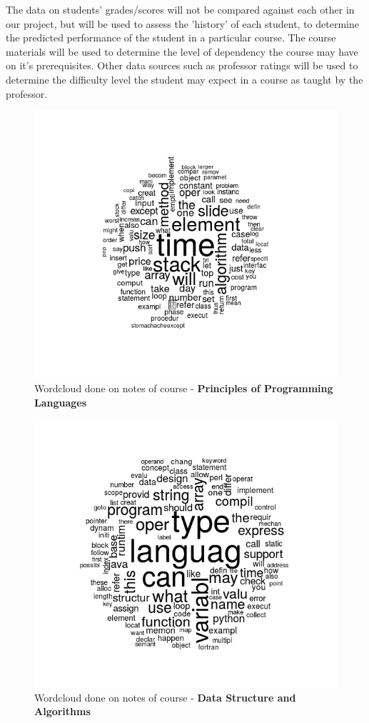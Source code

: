 \documentclass[conference]{IEEEtran}
\begin{document}
The data on students' grades/scores will not be compared against each other in our project, but will be used to assess the 'history' of each student, to determine the predicted performance of the student in a particular course. The course materials will be used to determine the level of dependency the course may have on it's prerequisites. Other data sources such as professor ratings will be used to determine the difficulty level the student may expect in a course as taught by the 
professor.
\begin{figure}
	\includegraphics[width=\linewidth]{ds.png}
	\caption{Wordcloud done on notes of course - \textbf{Principles of Programming Languages}}
	\label{fig:ppl}
\end{figure}	
\begin{figure}
	\includegraphics[width=\linewidth]{ppl.png}
	\caption{Wordcloud done on notes of course -\textbf{ Data Structure and Algorithms} }
	\label{fig:ds}
\end{figure}	
\end{document}

